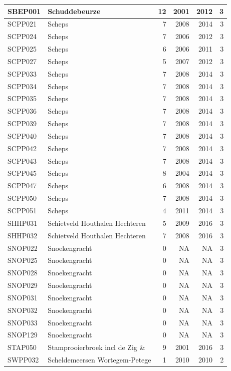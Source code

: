 \documentclass[11pt,]{book}
\begin{document}
\begin{table}
\begin{tabular}[t]{l|l|r|r|r|r}
\hline
SBEP001 & Schuddebeurze & 12 & 2001 & 2012 & 3\\
\hline
SCPP021 & Scheps & 7 & 2008 & 2014 & 3\\
\hline
SCPP024 & Scheps & 7 & 2006 & 2012 & 3\\
\hline
SCPP025 & Scheps & 6 & 2006 & 2011 & 3\\
\hline
SCPP027 & Scheps & 5 & 2007 & 2012 & 3\\
\hline
SCPP033 & Scheps & 7 & 2008 & 2014 & 3\\
\hline
SCPP034 & Scheps & 7 & 2008 & 2014 & 3\\
\hline
SCPP035 & Scheps & 7 & 2008 & 2014 & 3\\
\hline
SCPP036 & Scheps & 7 & 2008 & 2014 & 3\\
\hline
SCPP039 & Scheps & 7 & 2008 & 2014 & 3\\
\hline
SCPP040 & Scheps & 7 & 2008 & 2014 & 3\\
\hline
SCPP042 & Scheps & 7 & 2008 & 2014 & 3\\
\hline
SCPP043 & Scheps & 7 & 2008 & 2014 & 3\\
\hline
SCPP045 & Scheps & 8 & 2004 & 2014 & 3\\
\hline
SCPP047 & Scheps & 6 & 2008 & 2014 & 3\\
\hline
SCPP050 & Scheps & 7 & 2008 & 2014 & 3\\
\hline
SCPP051 & Scheps & 4 & 2011 & 2014 & 3\\
\hline
SHHP031 & Schietveld Houthalen Hechteren & 5 & 2009 & 2016 & 3\\
\hline
SHHP032 & Schietveld Houthalen Hechteren & 7 & 2008 & 2016 & 3\\
\hline
SNOP022 & Snoekengracht & 0 & NA & NA & 3\\
\hline
SNOP025 & Snoekengracht & 0 & NA & NA & 3\\
\hline
SNOP028 & Snoekengracht & 0 & NA & NA & 3\\
\hline
SNOP029 & Snoekengracht & 0 & NA & NA & 3\\
\hline
SNOP031 & Snoekengracht & 0 & NA & NA & 3\\
\hline
SNOP032 & Snoekengracht & 0 & NA & NA & 3\\
\hline
SNOP033 & Snoekengracht & 0 & NA & NA & 3\\
\hline
SNOP129 & Snoekengracht & 0 & NA & NA & 3\\
\hline
STAP050 & Stamprooierbroek incl de Zig \& & 9 & 2001 & 2016 & 3\\
\hline
SWPP032 & Scheldemeersen Wortegem-Petege & 1 & 2010 & 2010 & 2\\

\end{tabular}
\end{table}
\end{document}
